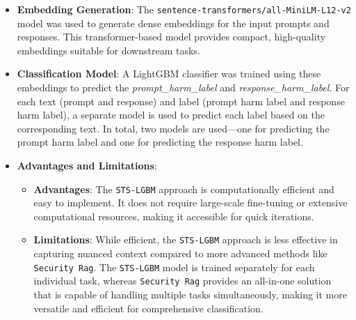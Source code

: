 \documentclass{article}
\begin{document}
\begin{itemize}
    \item \textbf{Embedding Generation}: The \texttt{sentence-transformers/all-MiniLM-L12-v2} model was used to generate dense embeddings for the input prompts and responses. This transformer-based model provides compact, high-quality embeddings suitable for downstream tasks.
    \item \textbf{Classification Model}: A LightGBM classifier was trained using these embeddings to predict the \textit{prompt\_harm\_label} and \textit{response\_harm\_label}. For each text (prompt and response) and label (prompt harm label and response harm label), a separate model is used to predict each label based on the corresponding text. In total, two models are used—one for predicting the prompt harm label and one for predicting the response harm label.
    \item \textbf{Advantages and Limitations}:
    \begin{itemize}
        \item \textbf{Advantages}: The \texttt{STS-LGBM} approach is computationally efficient and easy to implement. It does not require large-scale fine-tuning or extensive computational resources, making it accessible for quick iterations.
        \item \textbf{Limitations}: While efficient, the \texttt{STS-LGBM} approach is less effective in capturing nuanced context compared to more advanced methods like \texttt{Security Rag}. The \texttt{STS-LGBM} model is trained separately for each individual task, whereas \texttt{Security Rag} provides an all-in-one solution that is capable of handling multiple tasks simultaneously, making it more versatile and efficient for comprehensive classification.
        

\end{itemize}
\end{itemize}
\end{document}
